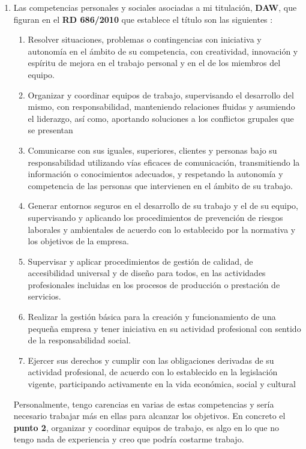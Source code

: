 \begin{enumerate}[label=(\alph*)]

\item Las competencias personales y sociales asociadas a mi titulación, \textbf{DAW}, que figuran en el \textbf{RD 686/2010} que establece el título son las siguientes \cite{rd686}:

    \begin{enumerate}[label=(\arabic*)]
        \item Resolver situaciones, problemas o contingencias con iniciativa y autonomía en el ámbito de su competencia, con creatividad, innovación y espíritu de mejora en el trabajo personal y en el de los miembros del equipo.
        \item Organizar y coordinar equipos de trabajo, supervisando el desarrollo del mismo, con responsabilidad, manteniendo relaciones fluidas y asumiendo el liderazgo, así como, aportando soluciones a los conflictos grupales que se presentan
        \item Comunicarse con sus iguales, superiores, clientes y personas bajo su responsabilidad utilizando vías eficaces de comunicación, transmitiendo la información o conocimientos adecuados, y respetando la autonomía y competencia de las personas que intervienen en el ámbito de su trabajo.
        \item Generar entornos seguros en el desarrollo de su trabajo y el de su equipo, supervisando y aplicando los procedimientos de prevención de riesgos laborales y ambientales de acuerdo con lo establecido por la normativa y los objetivos de la empresa.
        \item Supervisar y aplicar procedimientos de gestión de calidad, de accesibilidad universal y de diseño para todos, en las actividades profesionales incluidas en los procesos de producción o prestación de servicios.
        \item Realizar la gestión básica para la creación y funcionamiento de una pequeña	empresa y tener iniciativa en su actividad profesional con sentido de la responsabilidad social.
        \item Ejercer sus derechos y cumplir con las obligaciones derivadas de su actividad profesional, de acuerdo con lo establecido en la legislación vigente, participando activamente en la vida económica, social y cultural
    \end{enumerate}

     Personalmente, tengo carencias en varias de estas competencias y sería necesario trabajar más en ellas para alcanzar los objetivos. En concreto el\textbf{ punto 2}, organizar y coordinar equipos de trabajo, es algo en lo que no tengo nada de experiencia y creo que podría costarme trabajo.


\end{enumerate}
